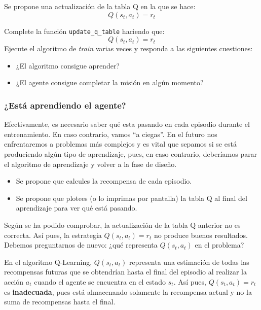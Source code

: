 \documentclass{article}
\begin{document}
\begin{itemize}
Se propone una actualización de la tabla Q en la que se hace:
$$Q(s_t,a_t)=r_t$$

\begin{exercise}
    Complete la función \texttt{update\_q\_table} haciendo que:
    $$Q(s_t,a_t)=r_t$$
    Ejecute el algoritmo de \textit{train} varias veces y responda a las siguientes cuestiones:
    \begin{itemize}
        \item ¿El algoritmo consigue aprender?
        \item ¿El agente consigue completar la misión en algún momento?
    \end{itemize}
\end{exercise}


\subsubsection{¿Está aprendiendo el agente?}
Efectivamente, es necesario saber qué esta pasando en cada episodio durante el entrenamiento. En caso contrario, vamos ``a ciegas''. En el futuro nos enfrentaremos a problemas más complejos y es vital que sepamos si se está produciendo algún tipo de aprendizaje, pues, en caso contrario, deberíamos parar el algoritmo de aprendizaje y volver a la fase de diseño. 
\begin{exercise}
    \begin{itemize}
    \item Se propone que calcules la recompensa de cada episodio.
    \item Se propone que plotees (o lo imprimas por pantalla) la tabla Q al final del aprendizaje para ver qué está pasando. 
\end{itemize}
\end{exercise}



Según se ha podido comprobar, la actualización de la tabla Q anterior no es correcta. Así pues, la estrategia $Q(s_t, a_t)=r_t$ no produce buenos resultados. Debemos preguntarnos de nuevo: ¿qué representa $Q(s_t,a_t)$ en el problema? 

En el algoritmo Q-Learning, $Q(s_t,a_t)$ representa una estimación de todas las recompensas futuras que se obtendrían hasta el final del episodio al realizar la acción $a_t$ cuando el agente se encuentra en el estado $s_t$. Así pues,  $Q(s_t,a_t)=r_t$ es \textbf{inadecuada}, pues está almacenando solamente la recompensa actual y no la suma de recompensas hasta el final.


\end{itemize}
\end{document}
